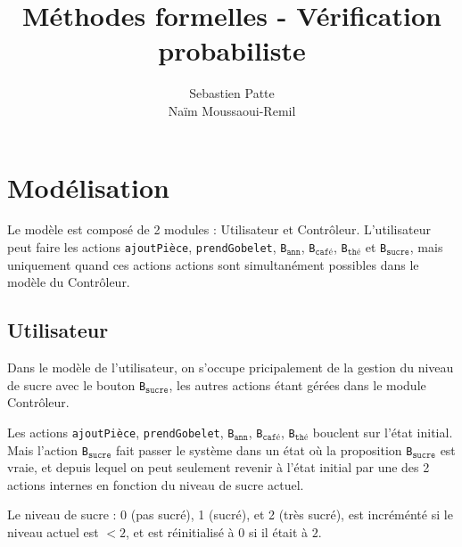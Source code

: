 \documentclass{article}
\author{Sebastien Patte \\ Naïm Moussaoui-Remil}
\title{Méthodes formelles - Vérification probabiliste}
\begin{document}
\maketitle


	
\section{Modélisation}

Le modèle est composé de 2 modules : Utilisateur et Contrôleur. 
L'utilisateur peut faire les actions \texttt{ajoutPièce}, \texttt{prendGobelet},
\texttt{B}$_\texttt{ann}$, \texttt{B}$_\texttt{café}$, \texttt{B}$_\texttt{thé}$ et \texttt{B}$_\texttt{sucre}$, mais uniquement quand ces actions actions sont simultanément possibles dans le modèle du Contrôleur.

\subsection{Utilisateur}

Dans le modèle de l'utilisateur, on s'occupe pricipalement de la gestion du niveau de sucre avec le bouton \texttt{B}$_\texttt{sucre}$, les autres actions étant gérées dans le module Contrôleur. 

Les actions \texttt{ajoutPièce}, \texttt{prendGobelet},
\texttt{B}$_\texttt{ann}$, \texttt{B}$_\texttt{café}$, \texttt{B}$_\texttt{thé}$ bouclent sur l'état initial. 
Mais l'action \texttt{B}$_\texttt{sucre}$ fait passer le système dans un état où la proposition \texttt{B}$_\texttt{sucre}$ est vraie, et depuis lequel on peut seulement revenir à l'état initial par une des 2 actions internes en fonction du niveau de sucre actuel.

Le niveau de sucre : 0 (pas sucré), 1 (sucré), et 2 (très sucré), est incréménté si le niveau actuel est $<2$, et est réinitialisé à $0$ si il était à $2$. 

\usetikzlibrary {automata,positioning}
\begin{figure}[h]
	\centering
{}
\end{figure}
\end{document}
